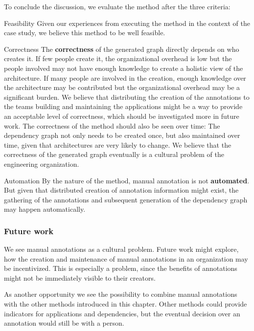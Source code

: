 To conclude the discussion, we evaluate the method after the three criteria:
\begin{tdescription}
  \item[Feasibility] Given our experiences from executing the method in the context of the case study, we believe this method to be well feasible.
  \item[Correctness] The \textbf{correctness} of the generated graph directly depends on who creates it. If few people create it, the organizational overhead is low but the people involved may not have enough knowledge to create a holistic view of the architecture. If many people are involved in the creation, enough knowledge over the architecture may be contributed but the organizational overhead may be a significant burden. We believe that distributing the creation of the annotations to the teams building and maintaining the applications might be a way to provide an acceptable level of correctness, which should be investigated more in future work. The correctness of the method should also be seen over time: The dependency graph not only needs to be created once, but also maintained over time, given that architectures are very likely to change. We believe that the correctness of the generated graph eventually is a cultural problem of the engineering organization.
  \item[Automation] By the nature of the method, manual annotation is not \textbf{automated}. But given that distributed creation of annotation information might exist, the gathering of the annotations and subsequent generation of the dependency graph may happen automatically.
\end{tdescription}

\subsubsection{Future work}

We see manual annotations as a cultural problem. Future work might explore, how the creation and maintenance of manual annotations in an organization may be incentivized. This is especially a problem, since the benefits of annotations might not be immediately visible to their creators.

As another opportunity we see the possibility to combine manual annotations with the other methods introduced in this chapter. Other methods could provide indicators for applications and dependencies, but the eventual decision over an annotation would still be with a person.

